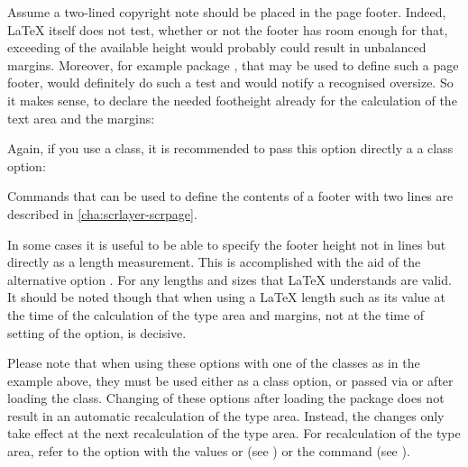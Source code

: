 \begin{Example}
  Assume a two-lined copyright note should be placed in the page
  footer. Indeed, \LaTeX{} itself does not test, whether or not the footer has
  room enough for that, exceeding of the available height would probably could
  result in unbalanced margins. Moreover, for example package
  , that may be used to define such a page footer,
  would definitely do such a test and would notify a recognised oversize. So
  it makes sense, to declare the needed footheight already for the calculation
  of the text area and the margins:
  Again, if you use a \KOMAScript{} class, it is recommended to pass this
  option directly a a class option:
  Commands that can be used to define the contents of a footer with two lines
  are described in \autoref{cha:scrlayer-scrpage}.
\end{Example}

In some cases it is useful to be able to specify the footer height not
in lines but directly as a length measurement. This is accomplished
with the aid of the alternative option . For
 any lengths and sizes that \LaTeX{} understands are
valid. It should be noted though that when using a \LaTeX{} length
such as  its value at the time of the calculation
of the type area and margins, not at the time of setting of the
option, is decisive.

Please note that when using these options with one of the
{\KOMAScript} classes as in the example above, they must be used
either as a class option, or passed via  or
 after loading the class. Changing of these options
after loading the  package does not result in an
automatic recalculation of the type area. Instead, the changes only
take effect at the next recalculation of the type area. For
recalculation of the type area, refer to the  option with
the values  or  (see
) or the
 command (see
).%
%
%



